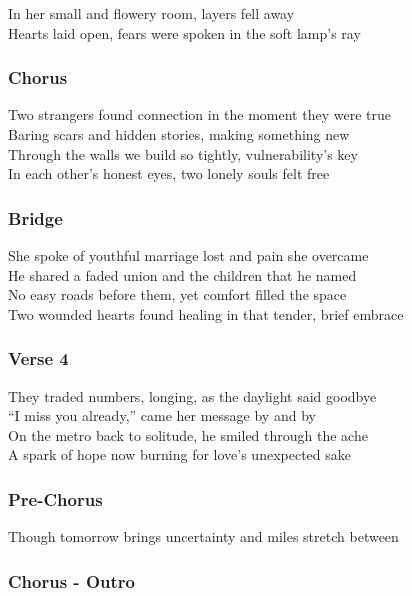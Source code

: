 \documentclass[]{article}
\begin{document}
In her small and flowery room, layers fell away\\
Hearts laid open, fears were spoken in the soft lamp's ray

\subsubsection{Chorus}\label{chorus-77}

Two strangers found connection in the moment they were true\\
Baring scars and hidden stories, making something new\\
Through the walls we build so tightly, vulnerability's key\\
In each other's honest eyes, two lonely souls felt free

\subsubsection{Bridge}\label{bridge-20}

She spoke of youthful marriage lost and pain she overcame\\
He shared a faded union and the children that he named\\
No easy roads before them, yet comfort filled the space\\
Two wounded hearts found healing in that tender, brief embrace

\subsubsection{Verse 4}\label{verse-4-10}

They traded numbers, longing, as the daylight said goodbye\\
``I miss you already,'' came her message by and by\\
On the metro back to solitude, he smiled through the ache\\
A spark of hope now burning for love's unexpected sake

\subsubsection{Pre-Chorus}\label{pre-chorus-46}

Though tomorrow brings uncertainty and miles stretch between

\subsubsection{Chorus - Outro}\label{chorus---outro-2}
\end{document}
